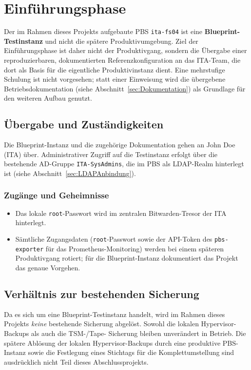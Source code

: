 \section{Einführungsphase}
\label{sec:Einfuehrungsphase}

Der im Rahmen dieses Projekts aufgebaute \ac{PBS} \texttt{ita-fs04}
ist eine \textbf{Blueprint-Testinstanz} und nicht die spätere
Produktivumgebung. Ziel der Einführungsphase ist daher nicht der
Produktivgang, sondern die Übergabe einer reproduzierbaren,
dokumentierten Referenzkonfiguration an das \ac{ITA}-Team, die
dort als Basis für die eigentliche Produktivinstanz dient.
Eine mehrstufige Schulung ist nicht vorgesehen; statt einer
Einweisung wird die übergebene Betriebsdokumentation
(siehe Abschnitt~\ref{sec:Dokumentation}) als Grundlage für den
weiteren Aufbau genutzt.

\subsection{Übergabe und Zuständigkeiten}
Die Blueprint-Instanz und die zugehörige Dokumentation gehen an
John Doe (\ac{ITA}) über. Administrativer Zugriff auf die
Testinstanz erfolgt über die bestehende \ac{AD}-Gruppe
\texttt{ITA-SysAdmins}, die im \ac{PBS} als \ac{LDAP}-Realm
hinterlegt ist (siehe Abschnitt~\ref{sec:LDAPAnbindung}).

\subsubsection*{Zugänge und Geheimnisse}
\begin{itemize}
    \item Das lokale \texttt{root}-Passwort wird im zentralen
          Bitwarden-Tresor der \ac{ITA} hinterlegt.
    \item Sämtliche Zugangsdaten (\texttt{root}-Passwort sowie der
          \ac{API}-Token des \texttt{pbs-exporter} für das
          Prometheus-Monitoring) werden bei einem späteren
          Produktivgang rotiert; für die Blueprint-Instanz
          dokumentiert das Projekt das genaue Vorgehen.
\end{itemize}

\subsection{Verhältnis zur bestehenden Sicherung}
Da es sich um eine Blueprint-Testinstanz handelt, wird im Rahmen
dieses Projekts \emph{keine} bestehende Sicherung abgelöst.
Sowohl die lokalen Hypervisor-Backups als auch die \ac{TSM}-/Tape-
Sicherung bleiben unverändert in Betrieb.
Die spätere Ablösung der lokalen Hypervisor-Backups durch eine
produktive \ac{PBS}-Instanz sowie die Festlegung eines Stichtags
für die Komplettumstellung sind ausdrücklich nicht Teil dieses
Abschlussprojekts.
